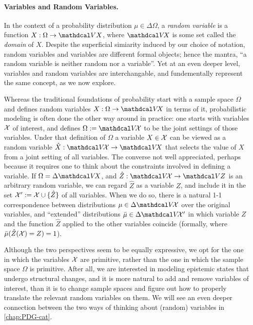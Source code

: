 \paragraph{Variables and Random Variables.}
    \label{sec:var-randomvar}
In the context of a probability distribution $\mu \in \Delta \Omega$,
a \emph{random variable} is a function $X : \Omega \to \V X$, where $\V\! X$ is some set called the \emph{domain} of $X$.
Despite the superficial simiarity induced by our choice of notation, random variables and variables are different formal objects;
    hence the mantra, 
    ``a random variable is neither random nor a variable''. 
Yet at an even deeper level, variables and random variables are interchangable, and fundementally represent the same concept, as we now explore. 

Whereas the traditional foundations of probability start with a sample space $\Omega$ and defines random variables $X : \Omega \to \V\!X$ in terms of it, 
probabilistic modeling is often done the other way around in practice: one starts with variables $\mathcal X$ of interest, and defines $\Omega := \V\!\X$ to be the joint settings of those variables. 
Under that definition of $\Omega$ a variable $X \in \mathcal X$ can be viewed as a random variable $\hat X : \V\!\X \to \V\!X$ that selects the value of $X$ from a joint setting of all variables.  
The converse not well appreciated, 
    perhaps because it requires one to think about
    the constraints involved in defining a variable.
If $\Omega = \Delta \V\!X$, and  
    $\hat Z : \V\!\X \to \V Z$
    is an arbitrary random variable, 
    we can regard $\hat Z$ as a variable $Z$, and include it in the set $\mathcal X' := \mathcal X \cup \{ \hat Z \}$ of all variables.
When we do so,  
there is a natural 1-1 correspondence between distributions $\mu \in \Delta \V\!\X$ over the original variables, and ``extended'' distributions 
$\bar\mu \in \Delta \V\!\X'$ in which variable $Z$ and the function $\hat Z$ applied to the other variables coincide (formally, where $\bar\mu(\hat Z(\mathcal X) = Z)=1$).

%
Although the two perspectives seem to be equally expressive, we opt for the one in which the variables $\mathcal X$ are primitive, rather than the one in which the sample space $\Omega$ is primitive. 
After all, we are interested in modeling epistemic states that undergo structural changes, and it is more natural to add and remove variables of interest, than it is to change sample spaces and figure out how to properly translate the relevant random variables on them.  
We will see an even deeper connection between the two ways of thinking about (random) variables in \cref{chap:PDG-cat}.

